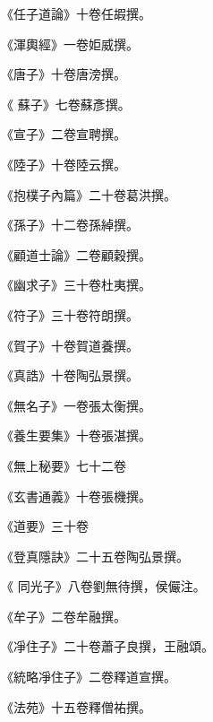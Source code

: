 \begin{pinyinscope}
 《任子道論》十卷任嘏撰。



 《渾輿經》一卷姖威撰。



 《唐子》十卷唐滂撰。



 《
 蘇子》七卷蘇彥撰。



 《宣子》二卷宣聘撰。



 《陸子》十卷陸云撰。



 《抱樸子內篇》二十卷葛洪撰。



 《孫子》十二卷孫綽撰。



 《顧道士論》二卷顧穀撰。



 《幽求子》三十卷杜夷撰。



 《符子》三十卷符朗撰。



 《賀子》十卷賀道養撰。



 《真誥》十卷陶弘景撰。



 《無名子》一卷張太衡撰。



 《養生要集》十卷張湛撰。



 《無上秘要》七十二卷



 《玄書通義》十卷張機撰。



 《道要》三十卷



 《登真隱訣》二十五卷陶弘景撰。



 《
 同光子》八卷劉無待撰，侯儼注。



 《牟子》二卷牟融撰。



 《凈住子》二十卷蕭子良撰，王融頌。



 《統略凈住子》二卷釋道宣撰。



 《法苑》十五卷釋僧祐撰。




\end{pinyinscope}
